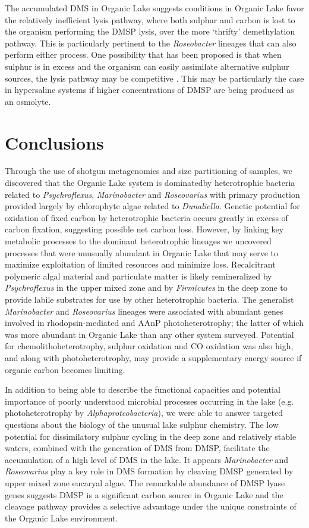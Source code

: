 The accumulated \ac{DMS} in Organic Lake suggests conditions in Organic Lake favor the relatively inefficient lysis pathway, where both sulphur and carbon is lost to the organism performing the \ac{DMSP} lysis, over the more `thrifty' demethylation pathway. 
This is particularly pertinent to the \emph{Roseobacter} lineages that can also perform either process. 
One possibility that has been proposed is that when sulphur is in excess and the organism can easily assimilate alternative sulphur sources, the lysis pathway may be competitive \cite{Johnston2008}. 
This may be particularly the case in hypersaline systems if higher concentrations of \ac{DMSP} are being produced as an osmolyte.

\section{Conclusions}
Through the use of shotgun metagenomics and size partitioning of samples, we discovered that the Organic Lake system is dominatedby heterotrophic bacteria related to \emph{Psychroflexus}, \emph{Marinobacter} and \emph{Roseovarius} with primary production provided largely by chlorophyte algae related to \emph{Dunaliella}. 
Genetic potential for oxidation of fixed carbon by heterotrophic bacteria occurs greatly in excess of carbon fixation, suggesting possible net carbon loss. 
However, by linking key metabolic processes to the dominant heterotrophic lineages we uncovered processes that were unusually abundant in Organic Lake that may serve to maximize exploitation of limited resources and minimize loss. 
Recalcitrant polymeric algal material and particulate matter is likely remineralized by \emph{Psychroflexus} in the upper mixed zone and by \emph{Firmicutes} in the deep zone to provide labile substrates for use by other heterotrophic bacteria. 
The generalist \emph{Marinobacter} and \emph{Roseovarius} lineages were associated with abundant genes involved in rhodopsin-mediated and \ac{AAnP} photoheterotrophy; the latter of which was more abundant in Organic Lake than any other system surveyed. 
Potential for chemolithoheterotrophy, sulphur oxidation and CO oxidation was also high, and along with photoheterotrophy, may provide a supplementary energy source if organic carbon becomes limiting.

In addition to being able to describe the functional capacities and potential importance of poorly understood microbial processes occurring in the lake (e.g. photoheterotrophy by \emph{Alphaproteobacteria}), we were able to answer targeted questions about the biology of the unusual lake sulphur chemistry. 
The low potential for dissimilatory sulphur cycling in the deep zone and relatively stable waters, combined with the generation of \ac{DMS} from \ac{DMSP}, facilitate the accumulation of a high level of \ac{DMS} in the lake. 
It appears \emph{Marinobacter} and \emph{Roseovarius} play a key role in \ac{DMS} formation by cleaving \ac{DMSP} generated by upper mixed zone eucaryal algae. 
The remarkable abundance of \ac{DMSP} lyase genes suggests \ac{DMSP} is a significant carbon source in Organic Lake and the cleavage pathway provides a selective advantage under the unique constraints of the Organic Lake environment.

